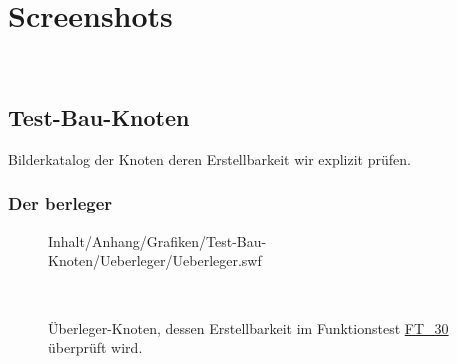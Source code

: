 %



\section{Screenshots}
\label{Anhang:Aufnahmen}


~\\



\newpage




\subsection*{Test-Bau-Knoten}

Bilderkatalog der Knoten deren Erstellbarkeit wir explizit prüfen.\\

	\subsubsection*{Der berleger\grqq}
	
	
		\begin{figure}[!h]
		
			\label{Abb:Test-Bau-Knoten:Ueberleger}
			\centering	
			
			{Inhalt/Anhang/Grafiken/Test-Bau-Knoten/Ueberleger/Ueberleger.swf}
			
			~\\
	
			\caption{Überleger-Knoten, dessen Erstellbarkeit im Funktionstest \hyperref[FT:30:2]{FT\_30} überprüft wird.}
	
		\end{figure}
		
